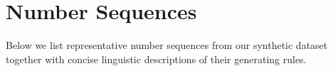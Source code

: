 \documentclass{article}
\theoremstyle{plain}
\theoremstyle{definition}
\theoremstyle{remark}
\begin{document}




\newpage
\appendix
\onecolumn

\section{Number Sequences}
\label{app:sequences}

Below we list representative number sequences from our synthetic dataset together with concise linguistic descriptions of their generating rules.
\end{document}
